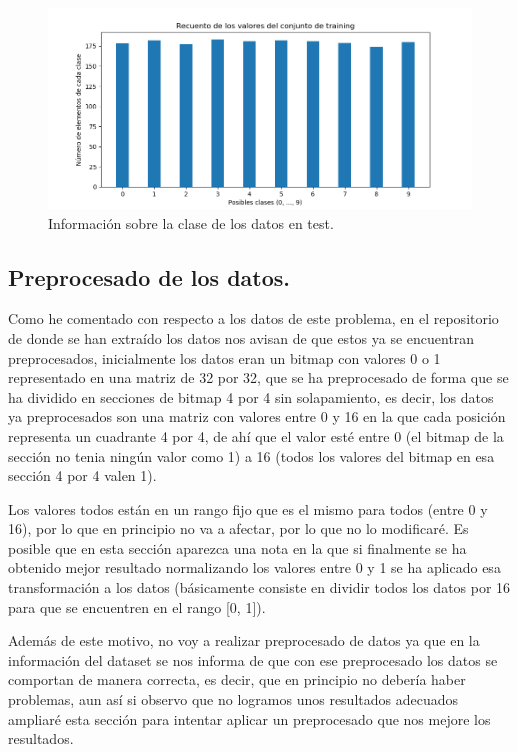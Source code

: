\documentclass[12pt, spanish]{article}
\begin{document}
\begin{figure}[H]
	\centering
	\includegraphics[scale=0.7]{clasificacion/datos_test.png}
	\caption{Información sobre la clase de los datos en test.}
	\label{claseDatosTestClasificacion}
\end{figure}

\newpage

\subsection{Preprocesado de los datos.}

Como he comentado con respecto a los datos de este problema, en el repositorio de donde se han extraído los datos nos avisan de que estos ya se encuentran preprocesados, inicialmente los datos eran un bitmap con valores 0 o 1 representado en una matriz de 32 por 32, que se ha preprocesado de forma que se ha dividido en secciones de bitmap 4 por 4 sin solapamiento, es decir, los datos ya preprocesados son una matriz con valores entre 0 y 16 en la que cada posición representa un cuadrante 4 por 4, de ahí que el valor esté entre 0 (el bitmap de la sección no tenia ningún valor como 1) a 16 (todos los valores del bitmap en esa sección 4 por 4 valen 1).

Los valores todos están en un rango fijo que es el mismo para todos (entre 0 y 16), por lo que en principio no va a afectar, por lo que no lo modificaré. Es posible que en esta sección aparezca una nota en la que si finalmente se ha obtenido mejor resultado normalizando los valores entre 0 y 1 se ha aplicado esa transformación a los datos (básicamente consiste en dividir todos los datos por 16 para que se encuentren en el rango [0, 1]).

Además de este motivo, no voy a realizar preprocesado de datos ya que en la información del dataset se nos informa de que con ese preprocesado los datos se comportan de manera correcta, es decir, que en principio no debería haber problemas, aun así si observo que no logramos unos resultados adecuados ampliaré esta sección para intentar aplicar un preprocesado que nos mejore los resultados.
\end{document}
